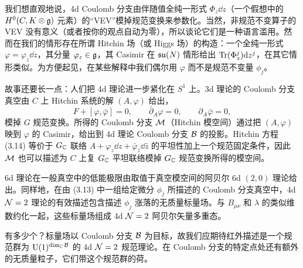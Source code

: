 我们想直观地说，4d Coulomb 分支由伴随值全纯一形式 $\Phi_z\dd z$（一个假想中的 $H^0(C,K\otimes\mathfrak{g})$ 元素）的“VEV”模掉规范变换来参数化。当然，非规范不变算子的 VEV 没有意义（或者按你的观点自动为零），所以谈论它们是一种语言滥用。然而在我们的情形存在所谓 Hitchin 场（或 Higgs 场）的构造：一个全纯一形式 $\varphi=\varphi_z\dd z$，其分量 $\varphi_z\in\mathfrak{g}$，其 Casimir 在 $\mathfrak{su}(N)$ 情形给出 $\operatorname{Tr}(\Phi^j_z)\mathrm{d} z^j$，在其它情形类似。为方便起见，在某些解释中我们偶尔用 $\varphi$ 而不是规范不变量 $\phi_j$。

故事还要长一点：人们把 4d 理论进一步紧化在 $S^1$ 上。3d 理论的 Coulomb 分支真空由 $C$ 上 Hitchin 系统的解 $(A,\varphi)$ 给出，
\begin{equation}
F+[\varphi,\bar\varphi]=0 ,\qquad \bar\partial_A\varphi=0 ,\qquad \partial_A\bar\varphi=0 ,
\tag{3.14}
\end{equation}
模掉 $G$ 规范变换。所得的 Coulomb 分支 $\mathcal{M}$（Hitchin 模空间）通过把 $(A,\varphi)$ 映到 $\varphi$ 的 Casimir，给出到 4d 理论 Coulomb 分支 $\mathcal{B}$ 的投影。Hitchin 方程 (3.14) 等价于 $G_{\mathbb{C}}$ 联络 $A+\varphi_z\dd z+\bar\varphi_{\bar z}\dd\bar z$ 的平坦性加上一个规范固定条件，因此 $\mathcal{M}$ 也可以描述为 $C$ 上复 $G_{\mathbb{C}}$ 平坦联络模掉 $G_{\mathbb{C}}$ 规范变换所得的模空间。



6d 理论在一般真空中的低能极限由取值于真空模空间的阿贝尔 6d $(2,0)$ 理论给出。同样地，在由 (3.13) 中一组给定微分 $\phi_j$ 所描述的 Coulomb 分支真空中，4d $\mathcal{N}=2$ 理论的有效描述包含描述 $\phi_j$ 涨落的无质量标量场。与 $B_{\mu\nu}$ 和 $\lambda$ 的类似维数约化一起，这些标量场组成 4d $\mathcal{N}=2$ 阿贝尔矢量多重态。

有多少个？标量场以 Coulomb 分支 $\mathcal{B}$ 为目标，故我们应期待红外描述是一个规范群为 $\mathrm{U}(1)^{\dim_{\mathbb{C}}\mathcal{B}}$ 的 4d $\mathcal{N}=2$ 规范理论。在 Coulomb 分支的特定点处还有额外的无质量粒子，它们带这个规范群的荷。

